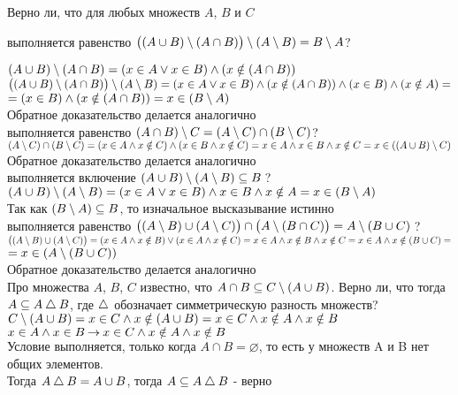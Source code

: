\documentclass[11pt]{article}
\begin{document}
	
	\p Верно ли, что для любых множеств $A$, $B$ и $C$
    
	\sp выполняется равенство
	$\big((A\cup B)\setminus (A\cap B)\big)\setminus (A\setminus B)  = B\setminus A$?
	
	$(A\cup B)\setminus (A\cap B) = (x \in A \lor x \in B) \land (x \notin (A \cap B))$\\
	$\big((A\cup B)\setminus (A\cap B)\big)\setminus (A\setminus B) = (x \in A \lor x \in B) \land (x \notin (A \cap B)) \land (x \in B) \land (x \notin A) = $ \\
	$= (x \in B) \land (x \notin (A \cap B)) = x \in (B \setminus A)$
	\\
	Обратное доказательство делается аналогично\\
	
	
	\sp выполняется равенство $(A\cap B)\setminus C = (A\setminus C)\cap (B\setminus C)$?\\
	$(A\setminus C)\cap (B\setminus C) = (x \in A \land x \notin C) \land (x \in B \land x \notin C) = x \in A \land x \in B \land x \notin C = x \in ((A \cup B) \setminus C)$\\
	Обратное доказательство делается аналогично\\
	
	
	\sp  выполняется включение $(A\cup B)\setminus (A\setminus B)\subseteq B$\,?\\
	$(A\cup B)\setminus (A\setminus B) = (x \in A \lor x \in B) \land x \in B \land x \notin A = x \in (B \setminus A)$\\
	Так как $(B \setminus A) \subseteq B$, то изначальное высказывание истинно \\
	
	\sp выполняется равенство
	$\big((A\setminus B)\cup (A\setminus C)\big) \cap \big(A\setminus (B\cap C)\big)  =
	A \setminus (B\cup C)$\,?\\
	$\big((A\setminus B)\cup (A\setminus C)\big) = (x \in A \land x \notin B) \lor (x \in A \land x \notin C) = x \in A \land x\notin B \land x \notin C = x \in A \land x \notin (B \cup C) = $\\
	$ = x \in (A \setminus (B \cup C))$\\
	Обратное доказательство делается аналогично\\
	
	
	
	\p Про множества $A$, $B$, $C$ известно, что $A\cap B\subseteq C\setminus (A\cup B)$. Верно ли, что тогда
	$A\subseteq A \mathbin{\triangle} B$, где $\mathbin{\triangle}$ обозначает симметрическую разность множеств? \\
	$C \setminus (A\cup B) = x \in C \land x \notin (A \cup B) = x \in C \land x \notin A \land x \notin B$\\
	$x \in A \land x \in B \mathbin{\to} x \in C \land x \notin A \land x \notin B$\\
	Условие выполняется, только когда $A \cap B = \varnothing$, то есть у множеств A и B нет общих элементов.\\
	Тогда $A \mathbin{\triangle} B = A \cup B$, тогда $A\subseteq A \mathbin{\triangle} B$ - верно
	
	
\end{document}
